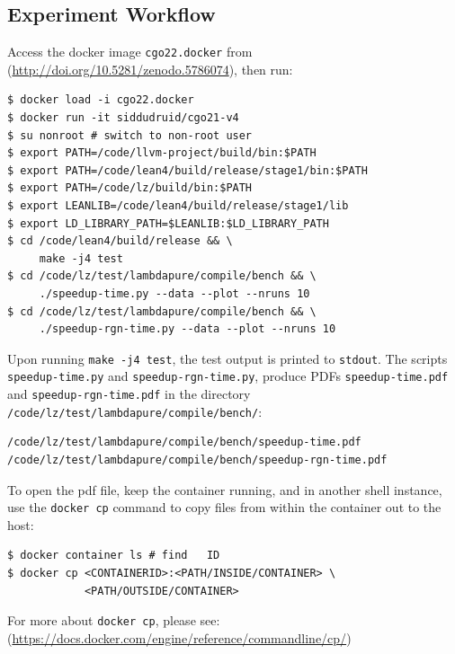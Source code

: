 \documentclass[conference]{IEEEtran}
\begin{document}
{%
\subsection{Experiment Workflow}

Access the docker image \texttt{cgo22.docker} from
(\url{http://doi.org/10.5281/zenodo.5786074}), then run:

\begin{verbatim}
$ docker load -i cgo22.docker
$ docker run -it siddudruid/cgo21-v4
$ su nonroot # switch to non-root user
$ export PATH=/code/llvm-project/build/bin:$PATH
$ export PATH=/code/lean4/build/release/stage1/bin:$PATH
$ export PATH=/code/lz/build/bin:$PATH
$ export LEANLIB=/code/lean4/build/release/stage1/lib
$ export LD_LIBRARY_PATH=$LEANLIB:$LD_LIBRARY_PATH
$ cd /code/lean4/build/release && \
     make -j4 test
$ cd /code/lz/test/lambdapure/compile/bench && \
     ./speedup-time.py --data --plot --nruns 10
$ cd /code/lz/test/lambdapure/compile/bench && \
     ./speedup-rgn-time.py --data --plot --nruns 10
\end{verbatim}


Upon running \texttt{make -j4 test}, the test output is printed to \texttt{stdout}.
The scripts \texttt{speedup-time.py} and \texttt{speedup-rgn-time.py},
produce PDFs \texttt{speedup-time.pdf} and \texttt{speedup-rgn-time.pdf}
in the directory \texttt{/code/lz/test/lambdapure/compile/bench/}:

\begin{verbatim}
/code/lz/test/lambdapure/compile/bench/speedup-time.pdf
/code/lz/test/lambdapure/compile/bench/speedup-rgn-time.pdf
\end{verbatim}

To open the pdf file, keep the container running, and in another
shell instance, use the \texttt{docker cp}
command to copy files from within the container out to the host:

\begin{verbatim}
$ docker container ls # find   ID
$ docker cp <CONTAINERID>:<PATH/INSIDE/CONTAINER> \
            <PATH/OUTSIDE/CONTAINER>
\end{verbatim}
For more about \texttt{docker cp}, please see:
(\url{https://docs.docker.com/engine/reference/commandline/cp/})


}
\end{document}
